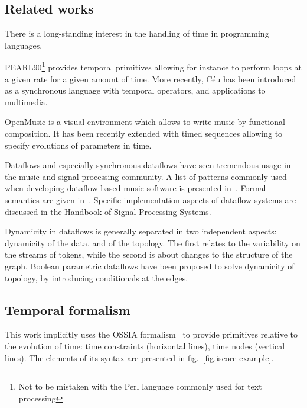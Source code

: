 \documentclass{article}
\begin{document}
\subsection{Related works}
There is a long-standing interest in the handling of time in programming languages.

PEARL90\cite{halang2001safe}\footnote{Not to be mistaken with the Perl language commonly used for text processing} provides temporal primitives allowing for instance to perform loops at a given rate for a given amount of time.
More recently, Céu has been introduced as a synchronous language with temporal operators, and applications to multimedia\cite{Santos:2016:CLI:2976796.2976856}.

OpenMusic is a visual environment which allows to write music by functional composition.
It has been recently extended with timed sequences allowing to specify evolutions of parameters in time\cite{garcia:hal-01484077}.

Dataflows and especially synchronous dataflows have seen tremendous usage in the music and signal processing community. 
A list of patterns commonly used when developing dataflow-based music software is presented in~\cite{arumi2006dataflow}.
Formal semantics are given in~\cite{benveniste_data-flow_1993}.
Specific implementation aspects of dataflow systems are discussed in the Handbook of Signal Processing Systems\cite{bhattacharyya_handbook_2013}. 

Dynamicity in dataflows is generally separated in two independent aspects: dynamicity of the data, and of the topology.
The first relates to the variability on the streams of tokens, while the second is about changes to the structure of the graph. 
Boolean parametric dataflows\cite{bempelis2015boolean} have been proposed to solve dynamicity of topology, by introducing conditionals at the edges.

\subsection{Temporal formalism}
This work implicitly uses the OSSIA formalism~\cite{celerier2015ossia} to provide primitives relative to the evolution of time: time constraints (horizontal lines), time nodes (vertical lines). 
The elements of its syntax are presented in fig.~\ref{fig.iscore-example}.
    
\end{document}
